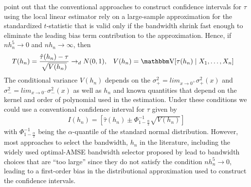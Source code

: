 \documentclass[12pt,fleqn]{article}
\begin{document}
\cite{calonico2014} point out that the conventional approaches to construct confidence intervals for $\tau$ using the local linear estimator rely on a large-sample approximation for the standardized $t$-statistic that is valid only if the bandwidth shrink fast enough to eliminate the leading bias term contribution to the approximation. Hence, if $nh_{n}^{5}\rightarrow0$ and $nh_{n}\rightarrow \infty$, then
 \begin{align}
  T(h_{n}) &=\frac{\hat{\tau}(h_{n})-\tau}{\sqrt{V(h_{n})}}\rightarrow_{d}N(0,1), &
  V(h_{n}) &=\V[\tau(h_{n}) \mid X_1,\dots,X_n]
 \end{align}
 The conditional variance $V(h_{n})$ depends on the $\sigma^{2}_{+}=lim_{x \rightarrow 0^{+}}\sigma^{2}_{+}(x)$ and $\sigma^{2}_{-}=lim_{x \rightarrow 0^{-}}\sigma^{2}_{-}(x)$ as well as $h_{n}$ and known quantities that depend on the kernel and order of polynomial used in the estimation. Under these conditions we could use a conventional confidence interval for $\tau$ given by
 \begin{align}
  I(h_{n})=\left[\hat{\tau}(h_{n})\pm \Phi^{-1}_{1-\frac{\alpha}{2}}\sqrt{V(h_{n})} \right]
 \end{align}
with $\Phi^{-1}_{1-\frac{\alpha}{2}}$ being the $\alpha$-quantile of the standard normal distribution. However, most approaches to select the bandwidth, $h_{n}$ in the literature, including the widely used optimal-AMSE bandwidth selector proposed by \cite{IK} lead to bandwidth choices that are ``too large'' since they do not satisfy the condition $nh_{n}^{5}\rightarrow0$, leading to a first-order bias in the distributional approximation used to construct the confidence intervals.
\end{document}

